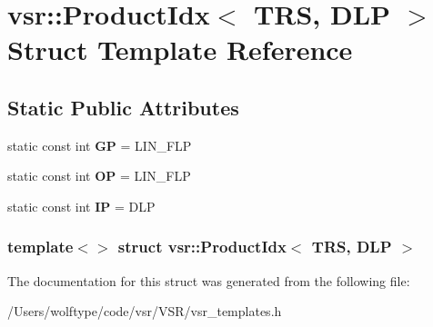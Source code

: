 \hypertarget{structvsr_1_1_product_idx_3_01_t_r_s_00_01_d_l_p_01_4}{\section{vsr\-:\-:Product\-Idx$<$ T\-R\-S, D\-L\-P $>$ Struct Template Reference}
\label{structvsr_1_1_product_idx_3_01_t_r_s_00_01_d_l_p_01_4}
}
\subsection*{Static Public Attributes}
\begin{DoxyCompactItemize}
\item 
\hypertarget{structvsr_1_1_product_idx_3_01_t_r_s_00_01_d_l_p_01_4_a1b7f68499d0bb9e8c21e62a8def4d57b}{static const int {\bfseries G\-P} = L\-I\-N\-\_\-\-F\-L\-P}\label{structvsr_1_1_product_idx_3_01_t_r_s_00_01_d_l_p_01_4_a1b7f68499d0bb9e8c21e62a8def4d57b}

\item 
\hypertarget{structvsr_1_1_product_idx_3_01_t_r_s_00_01_d_l_p_01_4_a2b7056a8661a150c65d3aae54cbcb320}{static const int {\bfseries O\-P} = L\-I\-N\-\_\-\-F\-L\-P}\label{structvsr_1_1_product_idx_3_01_t_r_s_00_01_d_l_p_01_4_a2b7056a8661a150c65d3aae54cbcb320}

\item 
\hypertarget{structvsr_1_1_product_idx_3_01_t_r_s_00_01_d_l_p_01_4_a9843e2fd504e0112aad15d2de4dd7903}{static const int {\bfseries I\-P} = D\-L\-P}\label{structvsr_1_1_product_idx_3_01_t_r_s_00_01_d_l_p_01_4_a9843e2fd504e0112aad15d2de4dd7903}

\end{DoxyCompactItemize}
\subsubsection*{template$<$$>$ struct vsr\-::\-Product\-Idx$<$ T\-R\-S, D\-L\-P $>$}



The documentation for this struct was generated from the following file\-:\begin{DoxyCompactItemize}
\item 
/\-Users/wolftype/code/vsr/\-V\-S\-R/vsr\-\_\-templates.\-h\end{DoxyCompactItemize}
